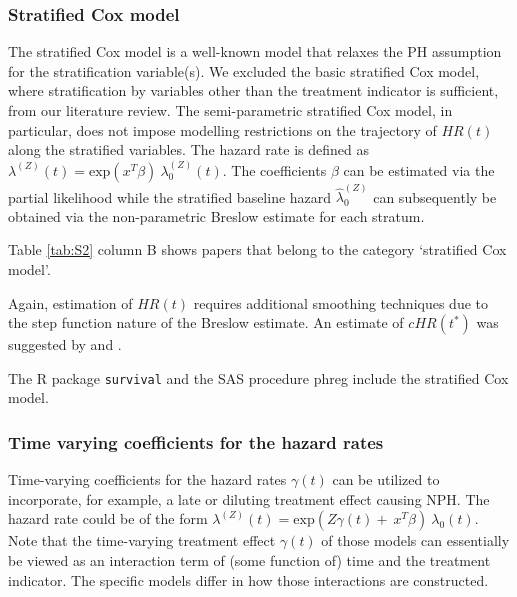 \subsubsection{ Stratified Cox model}\label{StratCox}

\noindent 


\noindent The stratified Cox model is a well-known model that relaxes the PH assumption for the stratification variable(s). We excluded the basic stratified Cox model, where stratification by variables other than the treatment indicator is sufficient, from our literature review. The semi-parametric stratified Cox model, in particular, does not impose modelling restrictions on the trajectory of $HR\left(t\right)$ along the stratified variables. The hazard rate is defined as ${\lambda }^{(Z)}\left(t\right)={\mathrm{exp} (x^T\beta )\ }{\lambda }^{(Z)}_0\left(t\right)$. The coefficients $\beta $ can be estimated via the partial likelihood while the stratified baseline hazard ${\widehat{\lambda }}^{(Z)}_0$ can subsequently be obtained via the non-parametric Breslow estimate for each stratum. 

\noindent Table \ref{tab:S2} column B shows papers that belong to the category `stratified Cox model'. 

\noindent 

\noindent Again, estimation of $HR\left(t\right)$ requires additional smoothing techniques due to the step function nature of the Breslow estimate. 
An estimate of $cHR\left(t^*\right)$ was suggested by \cite{Dong.2012} and \cite{Wei.2008}. 

\noindent 


\noindent The R package \texttt{survival} and the SAS procedure phreg include the stratified Cox model. 

\noindent 


\subsubsection{Time varying coefficients for the hazard rates} \label{time varying}

\noindent 


\noindent Time-varying coefficients for the hazard rates $\gamma (t)$ can be utilized to incorporate, for example, a late or diluting treatment effect causing NPH. The hazard rate could be of the form ${\lambda }^{(Z)}\left(t\right)={\mathrm{exp} (Z\gamma \left(t\right)+\ x^T\beta )\ }{\lambda }_0\left(t\right)$. Note that the time-varying treatment effect $\gamma \left(t\right)$ of those models can essentially be viewed as an interaction term of (some function of) time and the treatment indicator. The specific models differ in how those interactions are constructed. 

